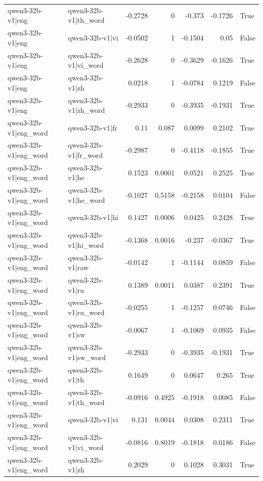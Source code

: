 \begin{table}
\begin{tabular}{l l r r r r l}
qwen3-32b-v1|eng & qwen3-32b-v1|th_word & -0.2728 & 0 & -0.373 & -0.1726 & True \\
qwen3-32b-v1|eng & qwen3-32b-v1|vi & -0.0502 & 1 & -0.1504 & 0.05 & False \\
qwen3-32b-v1|eng & qwen3-32b-v1|vi_word & -0.2628 & 0 & -0.3629 & -0.1626 & True \\
qwen3-32b-v1|eng & qwen3-32b-v1|zh & 0.0218 & 1 & -0.0784 & 0.1219 & False \\
qwen3-32b-v1|eng & qwen3-32b-v1|zh_word & -0.2933 & 0 & -0.3935 & -0.1931 & True \\
qwen3-32b-v1|eng_word & qwen3-32b-v1|fr & 0.11 & 0.087 & 0.0099 & 0.2102 & True \\
qwen3-32b-v1|eng_word & qwen3-32b-v1|fr_word & -0.2987 & 0 & -0.4118 & -0.1855 & True \\
qwen3-32b-v1|eng_word & qwen3-32b-v1|he & 0.1523 & 0.0001 & 0.0521 & 0.2525 & True \\
qwen3-32b-v1|eng_word & qwen3-32b-v1|he_word & -0.1027 & 0.5158 & -0.2158 & 0.0104 & False \\
qwen3-32b-v1|eng_word & qwen3-32b-v1|hi & 0.1427 & 0.0006 & 0.0425 & 0.2428 & True \\
qwen3-32b-v1|eng_word & qwen3-32b-v1|hi_word & -0.1368 & 0.0016 & -0.237 & -0.0367 & True \\
qwen3-32b-v1|eng_word & qwen3-32b-v1|raw & -0.0142 & 1 & -0.1144 & 0.0859 & False \\
qwen3-32b-v1|eng_word & qwen3-32b-v1|ru & 0.1389 & 0.0011 & 0.0387 & 0.2391 & True \\
qwen3-32b-v1|eng_word & qwen3-32b-v1|ru_word & -0.0255 & 1 & -0.1257 & 0.0746 & False \\
qwen3-32b-v1|eng_word & qwen3-32b-v1|sw & -0.0067 & 1 & -0.1069 & 0.0935 & False \\
qwen3-32b-v1|eng_word & qwen3-32b-v1|sw_word & -0.2933 & 0 & -0.3935 & -0.1931 & True \\
qwen3-32b-v1|eng_word & qwen3-32b-v1|th & 0.1649 & 0 & 0.0647 & 0.265 & True \\
qwen3-32b-v1|eng_word & qwen3-32b-v1|th_word & -0.0916 & 0.4925 & -0.1918 & 0.0085 & False \\
qwen3-32b-v1|eng_word & qwen3-32b-v1|vi & 0.131 & 0.0044 & 0.0308 & 0.2311 & True \\
qwen3-32b-v1|eng_word & qwen3-32b-v1|vi_word & -0.0816 & 0.8019 & -0.1818 & 0.0186 & False \\
qwen3-32b-v1|eng_word & qwen3-32b-v1|zh & 0.2029 & 0 & 0.1028 & 0.3031 & True \\

\end{tabular}
\end{table}

